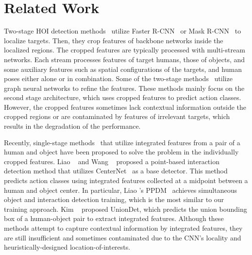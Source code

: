 \documentclass[final]{cvpr}
\begin{document}
\section{Related Work}
Two-stage HOI detection methods~\cite{chao_wacv2018, gao_eccv2020, gao_bmvc2018, gkioxari_cvpr2018, gupta_iccv2019, zhi_eccv2020, kim_dong_eccv2020, li_cvpr2020, li_cvpr2019, lin_ijcai2020, liu_eccv2020, ulutan_cvpr2020, wan_iccv2019, hai_eccv2020, xu_tmm2020, yang_ijcai2020, zhong_eccv2020, zhou_iccv2019, qi_eccv2018, wang_iccv2019, zhou_cvpr2020} utilize Faster R-CNN~\cite{ren_nips2015} or Mask R-CNN~\cite{he_iccv2017} to localize targets. Then, they crop features of backbone networks inside the localized regions. The cropped features are typically processed with multi-stream networks. Each stream processes features of target humans, those of objects, and some auxiliary features such as spatial configurations of the targets, and human poses either alone or in combination. Some of the two-stage methods~\cite{qi_eccv2018, ulutan_cvpr2020, hai_eccv2020, yang_ijcai2020, zhou_iccv2019} utilize graph neural networks to refine the features. These methods mainly focus on the second stage architecture, which uses cropped features to predict action classes. However, the cropped features sometimes lack contextual information outside the cropped regions or are contaminated by features of irrelevant targets, which results in the degradation of the performance.

Recently, single-stage methods~\cite{liao_cvpr2020, wang_cvpr2020, kim_bumsoo_eccv2020} that utilize integrated features from a pair of a human and object have been proposed to solve the problem in the individually cropped features.
Liao \etal~\cite{liao_cvpr2020} and Wang \etal~\cite{wang_cvpr2020} proposed a point-based interaction detection method that utilizes CenterNet~\cite{zhou_center_arxiv2019} as a base detector.
This method predicts action classes using integrated features collected at a midpoint between a human and object center.
In particular, Liao \etal's PPDM~\cite{liao_cvpr2020} achieves simultaneous object and interaction detection training, which is the most similar to our training approach. Kim \etal~\cite{kim_bumsoo_eccv2020} proposed UnionDet, which predicts the union bounding box of a human-object pair to extract integrated features. Although these methods attempt to capture contextual information by integrated features, they are still insufficient and sometimes contaminated due to the CNN's locality and heuristically-designed location-of-interests.
\end{document}
